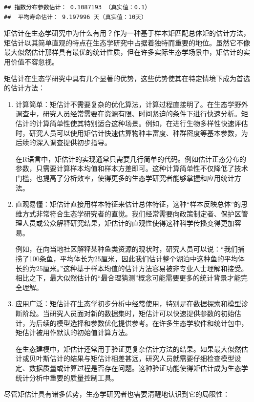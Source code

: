 \documentclass[
  twoside,12pt,fontset=none]{ctexbook}
\begin{document}
\begin{verbatim}
## 指数分布参数估计： 0.1087193 （真实值：0.1）
##  平均寿命估计： 9.197996 天（真实值：10天）
\end{verbatim}

矩估计在生态学研究中为什么有用？作为一种基于样本矩匹配总体矩的估计方法，矩估计以其简单直观的特点在生态学研究中占据着独特而重要的地位。虽然它不像最大似然估计那样具有最优的统计性质，但在许多实际生态学场景中，矩估计的实用价值不容忽视。

矩估计在生态学研究中具有几个显著的优势，这些优势使其在特定情境下成为首选的估计方法：

\begin{enumerate}
\def\labelenumi{\arabic{enumi}.}
\item
  计算简单：矩估计不需要复杂的优化算法，计算过程直接明了。在生态学野外调查中，研究人员经常需要在资源有限、时间紧迫的条件下进行快速分析。矩估计的计算简单性使其特别适合这种场景。例如，在进行生物多样性快速评估时，研究人员可以使用矩估计快速估算物种丰富度、种群密度等基本参数，为后续的深入调查提供初步指导。

  在R语言中，矩估计的实现通常只需要几行简单的代码。例如估计正态分布的参数，只需要计算样本均值和样本方差即可。这种计算简单性不仅降低了技术门槛，也提高了分析效率，使得更多的生态学研究者能够掌握和应用统计方法。
\item
  直观易懂：矩估计直接用样本特征来估计总体特征，这种``样本反映总体''的思维方式非常符合生态学研究者的直觉。我们经常需要向政策制定者、保护区管理人员或公众解释研究结果，矩估计的直观性使得这种科学传播变得更加容易。

  例如，在向当地社区解释某种鱼类资源的现状时，研究人员可以说：``我们捕捞了100条鱼，平均体长为25厘米，因此我们估计整个湖泊中这种鱼的平均体长约为25厘米。''这种基于样本均值的估计方法容易被非专业人士理解和接受。相比之下，最大似然估计的``最合理猜测''概念可能需要更多的统计背景才能完全理解。
\item
  应用广泛：矩估计在生态学初步分析中经常使用，特别是在数据探索和模型诊断阶段。当研究人员面对新的数据集时，矩估计可以快速提供参数的初始估计，为后续的模型选择和参数优化提供参考。在许多生态学软件和统计包中，矩估计被用作默认的初始值计算方法。

  在生态建模中，矩估计还常用于验证更复杂估计方法的结果。如果最大似然估计或贝叶斯估计的结果与矩估计相差甚远，研究人员就需要仔细检查模型设定、数据质量或计算过程是否存在问题。这种验证功能使得矩估计成为生态学统计分析中重要的质量控制工具。
\end{enumerate}

尽管矩估计具有诸多优势，生态学研究者也需要清醒地认识到它的局限性：
\end{document}
